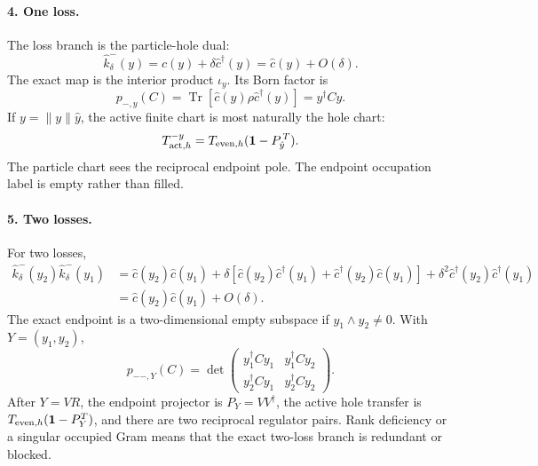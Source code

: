 \documentclass[aps,prb,onecolumn,nofootinbib,superscriptaddress]{revtex4-2}
\newcommand{\I}{\mathbf{1}}
\newcommand{\Tr}{\operatorname{Tr}}
\theoremstyle{plain}
\theoremstyle{definition}
\begin{document}
\paragraph*{4. One loss.}
The loss branch is the particle-hole dual:
\begin{equation}
  \hat k_\delta^-(y)
  =
  \hat c(y)+\delta\hat c^\dagger(y)
  =
  \hat c(y)+O(\delta).
  \label{eq:one-loss-delta-limit}
\end{equation}
The exact map is the interior product \(\iota_y\).  Its Born factor is
\begin{equation}
  p_{-,y}(C)
  =
  \Tr\!\left[\hat c(y)\rho\hat c^\dagger(y)\right]
  =
  y^\dagger C y .
  \label{eq:one-loss-delta-born}
\end{equation}
If \(y=\|y\|\hat y\), the active finite chart is most naturally the hole
chart:
\begin{equation}
  T_{{\rm act},h}^{-y}
  =
  T_{{\rm even},h}(\I-P_{\hat y}^{\,T}).
  \label{eq:one-loss-active-transfer}
\end{equation}
The particle chart sees the reciprocal endpoint pole.  The endpoint
occupation label is empty rather than filled.

\paragraph*{5. Two losses.}
For two losses,
\begin{align}
  \hat k_\delta^-(y_2)\hat k_\delta^-(y_1)
  &=
  \hat c(y_2)\hat c(y_1)
  +\delta\!\left[
    \hat c(y_2)\hat c^\dagger(y_1)
    +\hat c^\dagger(y_2)\hat c(y_1)
  \right]
  +\delta^2\hat c^\dagger(y_2)\hat c^\dagger(y_1)
  \nonumber\\
  &=
  \hat c(y_2)\hat c(y_1)+O(\delta).
  \label{eq:two-loss-regulated-expansion}
\end{align}
The exact endpoint is a two-dimensional empty subspace if
\(y_1\wedge y_2\ne0\).  With \(Y=(y_1,y_2)\),
\begin{equation}
  p_{--,Y}(C)
  =
  \det
  \begin{pmatrix}
    y_1^\dagger C y_1 & y_1^\dagger C y_2\\
    y_2^\dagger C y_1 & y_2^\dagger C y_2
  \end{pmatrix}.
  \label{eq:two-loss-born-determinant}
\end{equation}
After \(Y=VR\), the endpoint projector is \(P_Y=VV^\dagger\), the active
hole transfer is \(T_{{\rm even},h}(\I-P_Y^T)\), and there are two
reciprocal regulator pairs.  Rank deficiency or a singular occupied Gram
means that the exact two-loss branch is redundant or blocked.
\end{document}
